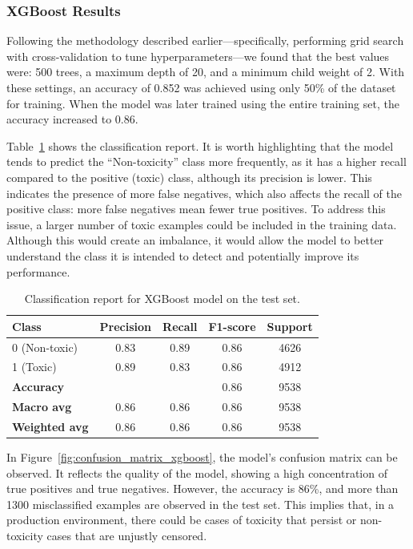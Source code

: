 \subsubsection{XGBoost Results}

Following the methodology described earlier—specifically, performing grid search with cross-validation to tune hyperparameters—we found that the best values were: 500 trees, a maximum depth of 20, and a minimum child weight of 2. With these settings, an accuracy of 0.852 was achieved using only 50\% of the dataset for training. When the model was later trained using the entire training set, the accuracy increased to 0.86.

Table~\ref{tab:xgboost_classification_report} shows the classification report. It is worth highlighting that the model tends to predict the “Non-toxicity” class more frequently, as it has a higher recall compared to the positive (toxic) class, although its precision is lower. This indicates the presence of more false negatives, which also affects the recall of the positive class: more false negatives mean fewer true positives. To address this issue, a larger number of toxic examples could be included in the training data. Although this would create an imbalance, it would allow the model to better understand the class it is intended to detect and potentially improve its performance.

\begin{table}[htbp]
\centering
\caption{Classification report for XGBoost model on the test set.}
\label{tab:xgboost_classification_report}
\begin{tabular}{lcccc}
\toprule
\textbf{Class} & \textbf{Precision} & \textbf{Recall} & \textbf{F1-score} & \textbf{Support} \\
\midrule
0 (Non-toxic)   & 0.83 & 0.89 & 0.86 & 4626 \\
1 (Toxic)       & 0.89 & 0.83 & 0.86 & 4912 \\
\midrule
\textbf{Accuracy}       &      &      & 0.86 & 9538 \\
\textbf{Macro avg}      & 0.86 & 0.86 & 0.86 & 9538 \\
\textbf{Weighted avg}   & 0.86 & 0.86 & 0.86 & 9538 \\
\bottomrule
\end{tabular}
\end{table}

In Figure~\ref{fig:confusion_matrix_xgboost}, the model's confusion matrix can be observed. It reflects the quality of the model, showing a high concentration of true positives and true negatives. However, the accuracy is 86\%, and more than 1300 misclassified examples are observed in the test set. This implies that, in a production environment, there could be cases of toxicity that persist or non-toxicity cases that are unjustly censored.

